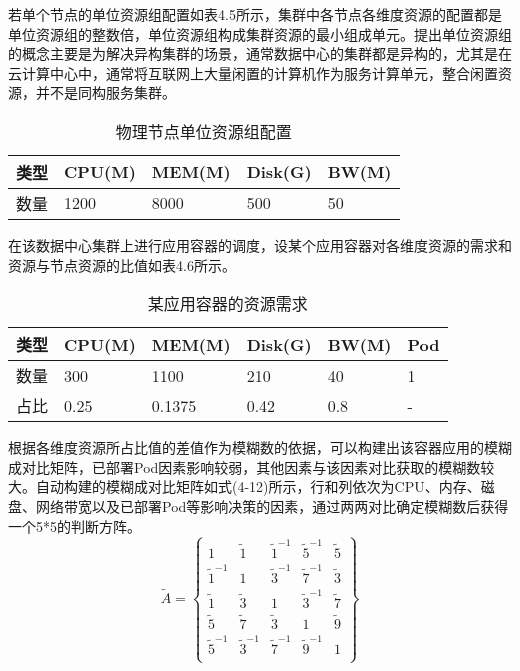 若单个节点的单位资源组配置如表4.5所示，集群中各节点各维度资源的配置都是单位资源组的整数倍，单位资源组构成集群资源的最小组成单元。提出单位资源组的概念主要是为解决异构集群的场景，通常数据中心的集群都是异构的，尤其是在云计算中心中，通常将互联网上大量闲置的计算机作为服务计算单元，整合闲置资源，并不是同构服务集群。
\begin{table}[htbp]
	\centering\dawu[1.3]
	\caption{物理节点单位资源组配置}
	\begin{tabular}{|p{2cm}<{\centering}|p{2cm}<{\centering}|p{2cm}<{\centering}|p{2cm}<{\centering}|p{2cm}<{\centering}|} \hline
		类型 & CPU(M) & MEM(M) & Disk(G) & BW(M) \\ \hline
		数量 & 1200 & 8000 & 500 & 50  \\ \hline
	\end{tabular}
\end{table}

在该数据中心集群上进行应用容器的调度，设某个应用容器对各维度资源的需求和资源与节点资源的比值如表4.6所示。
\begin{table}[htbp]
	\centering\dawu[1.3]
	\caption{某应用容器的资源需求}
	\begin{tabular}{|p{1.8cm}<{\centering}|p{1.8cm}<{\centering}|p{1.8cm}<{\centering}|p{1.8cm}<{\centering}|p{1.8cm}<{\centering}|p{1.8cm}<{\centering}|} \hline
		类型 & CPU(M) & MEM(M) & Disk(G) & BW(M) & Pod \\ \hline
		数量 & 300 & 1100 & 210 & 40 & 1 \\ \hline
		占比 & 0.25 & 0.1375 & 0.42 & 0.8 & - \\ \hline
	\end{tabular}
\end{table}

根据各维度资源所占比值的差值作为模糊数的依据，可以构建出该容器应用的模糊成对比矩阵，已部署Pod因素影响较弱，其他因素与该因素对比获取的模糊数较大。自动构建的模糊成对比矩阵如式(4-12)所示，行和列依次为CPU、内存、磁盘、网络带宽以及已部署Pod等影响决策的因素，通过两两对比确定模糊数后获得一个5*5的判断方阵。
\begin{equation}
\widetilde{A} = \left\{\begin{array}{ccccc}
1 & \widetilde{1} & \widetilde{1}^{-1} & \widetilde{5}^{-1} & \widetilde{5}  \\
\widetilde{1}^{-1} & 1 & \widetilde{3}^{-1} & \widetilde{7}^{-1} & \widetilde{3} \\
\widetilde{1} & \widetilde{3} & 1 & \widetilde{3}^{-1} & \widetilde{7} \\
\widetilde{5} & \widetilde{7} & \widetilde{3} & 1 & \widetilde{9} \\
\widetilde{5}^{-1} & \widetilde{3}^{-1} & \widetilde{7}^{-1} & \widetilde{9}^{-1} & 1 \\
\end{array}\right\}
\end{equation}

